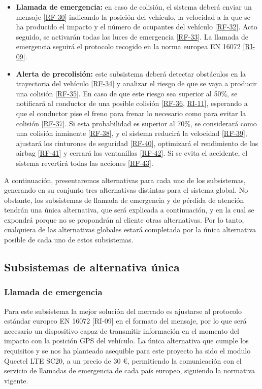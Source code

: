 \begin{itemize}[-]
\item \textbf{Llamada de emergencia:} en caso de colisión, el sistema deberá enviar un mensaje [\hyperref[tab:RF-30]{RF-30}] indicando la posición del vehículo, la velocidad a la que se ha producido el impacto y el número de ocupantes del vehículo [\hyperref[tab:RF-32]{RF-32}]. Acto seguido, se activarán todas las luces de emergencia [\hyperref[tab:RF-33]{RF-33}]. La llamada de emergencia seguirá el protocolo recogido en la norma europea EN 16072 [\hyperref[tab:RI-09]{RI-09}].
\item \textbf{Alerta de precolisión:} este subsistema deberá detectar obstáculos en la trayectoria del vehículo [\hyperref[tab:RF-34]{RF-34}] y analizar el riesgo de que se vaya a producir una colisión [\hyperref[tab:RF-35]{RF-35}]. En caso de que este riesgo sea superior al 50\%, se notificará al conductor de una posible colisión [\hyperref[tab:RF-36]{RF-36}, \hyperref[tab:RI-11]{RI-11}], esperando a que el conductor pise el freno para frenar lo necesario como para evitar la colisión [\hyperref[tab:RF-37]{RF-37}]. Si esta probabilidad es superior al 70\%, se considerará como una colisión inminente [\hyperref[tab:RF-38]{RF-38}], y el sistema reducirá la velocidad [\hyperref[tab:RF-39]{RF-39}], ajustará los cinturones de seguridad [\hyperref[tab:RF-40]{RF-40}], optimizará el rendimiento de los airbag [\hyperref[tab:RF-41]{RF-41}] y cerrará las ventanillas [\hyperref[tab:RF-42]{RF-42}]. Si se evita el accidente, el sistema revertirá todas las acciones [\hyperref[tab:RF-43]{RF-43}].
\end{itemize}

A continuación, presentaremos alternativas para cada uno de los subsistemas, generando en su conjunto tres alternativas distintas para el sistema global. No obstante, los subsistemas de llamada de emergencia y de pérdida de atención tendrán una única alternativa, que será explicada a continuación, y en la cual se expondrá porque no se propondrán al cliente otras alternativas. Por lo tanto, cualquiera de las alternativas globales estará completada por la única alternativa posible de cada uno de estos subsistemas.

\subsection{Subsistemas de alternativa única}
\subsubsection{Llamada de emergencia}
\par Para este subsistema  la mejor solución del mercado es ajustarse al protocolo estándar europeo EN 16072 [RI-09] en el formato del mensaje, por lo que será necesario un dispositivo capaz de transmitir información en el momento del impacto con la posición GPS del vehículo. La única alternativa que cumple los requisitos y se nos ha planteado asequible para este proyecto ha sido el modulo Quectel LTE SC20, a un precio de 30 \euro,  permitiendo la comunicación con el servicio de llamadas de emergencia de cada país europeo, siguiendo la normativa vigente.


